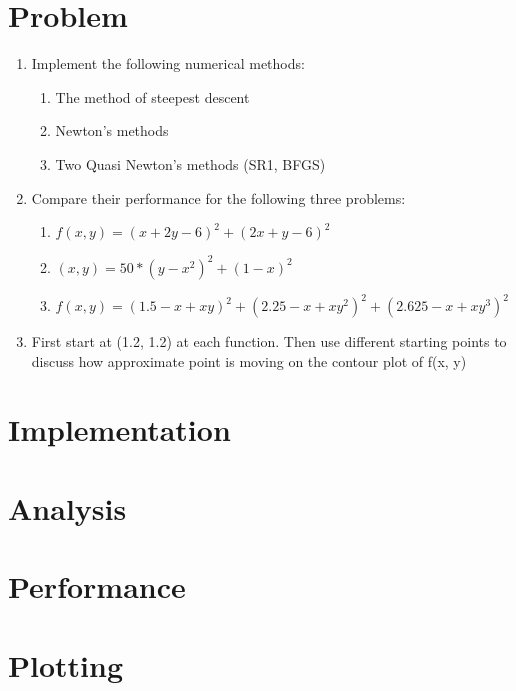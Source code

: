 \documentclass[12pt,letterpaper]{article}
\begin{document}
\section*{Problem}

\begin{enumerate}
  \item Implement the following numerical methods:
  \begin{enumerate}
    \item The method of steepest descent
    \item Newton's methods
    \item Two Quasi Newton's methods (SR1, BFGS)
  \end{enumerate}
  \item Compare their performance for the following three problems:
  \begin{enumerate}
    \item $f(x, y)=(x+2y-6)^2 + (2x+y-6)^2$
    \item $(x, y)=50*(y-x^2)^2 + (1-x)^2$
    \item $f(x, y)=(1.5-x+xy)^2 + (2.25-x+xy^2)^2 + (2.625 - x+ xy^3)^2$
  \end{enumerate}
  \item First start at (1.2, 1.2) at each function. 
  Then use different starting points to discuss how approximate point is moving on the contour plot of f(x, y)
\end{enumerate}

\section*{Implementation}


\newpage
\section*{Analysis}


\newpage
\section*{Performance}


\newpage
\section*{Plotting}

\end{document}
